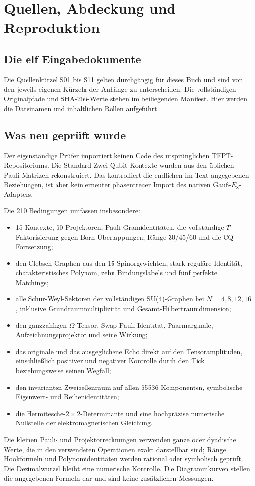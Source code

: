 \chapter{Quellen, Abdeckung und Reproduktion}
\section{Die elf Eingabedokumente}
Die Quellenkürzel S01 bis S11 gelten durchgängig für dieses Buch und sind von den jeweils eigenen Kürzeln der Anhänge zu unterscheiden. Die vollständigen Originalpfade und SHA-256-Werte stehen im beiliegenden Manifest. Hier werden die Dateinamen und inhaltlichen Rollen aufgeführt.


\section{Was neu geprüft wurde}
Der eigenständige Prüfer importiert keinen Code des ursprünglichen TFPT-Repositoriums. Die Standard-Zwei-Qubit-Kontexte wurden aus den üblichen Pauli-Matrizen rekonstruiert. Das kontrolliert die endlichen im Text angegebenen Beziehungen, ist aber kein erneuter phasentreuer Import des nativen Gauß-$E_8$-Adapters.

Die 210 Bedingungen umfassen insbesondere:
\begin{itemize}
\item 15 Kontexte, 60 Projektoren, Pauli-Gramidentitäten, die vollständige $T$-Faktorisierung gegen Born-Überlappungen, Ränge 30/45/60 und die CQ-Fortsetzung;
\item den Clebsch-Graphen aus den 16 Spinorgewichten, stark reguläre Identität, charakteristisches Polynom, zehn Bindungslabels und fünf perfekte Matchings;
\item alle Schur-Weyl-Sektoren der vollständigen SU(4)-Graphen bei $N=4,8,12,16$, inklusive Grundraummultiplizität und Gesamt-Hilbertraumdimension;
\item den ganzzahligen $\Omega$-Tensor, Swap-Pauli-Identität, Paarmarginale, Aufzeichnungsprojektor und seine Wirkung;
\item das originale und das ausgeglichene Echo direkt auf den Tensoramplituden, einschließlich positiver und negativer Kontrolle durch den Tick beziehungsweise seinen Wegfall;
\item den invarianten Zweizellenraum auf allen 65536 Komponenten, symbolische Eigenwert- und Reihenidentitäten;
\item die Hermitesche-$2\times2$-Determinante und eine hochpräzise numerische Nullstelle der elektromagnetischen Gleichung.
\end{itemize}
Die kleinen Pauli- und Projektorrechnungen verwenden ganze oder dyadische Werte, die in den verwendeten Operationen exakt darstellbar sind; Ränge, Hookformeln und Polynomidentitäten werden rational oder symbolisch geprüft. Die Dezimalwurzel bleibt eine numerische Kontrolle. Die Diagrammkurven stellen die angegebenen Formeln dar und sind keine zusätzlichen Messungen.

